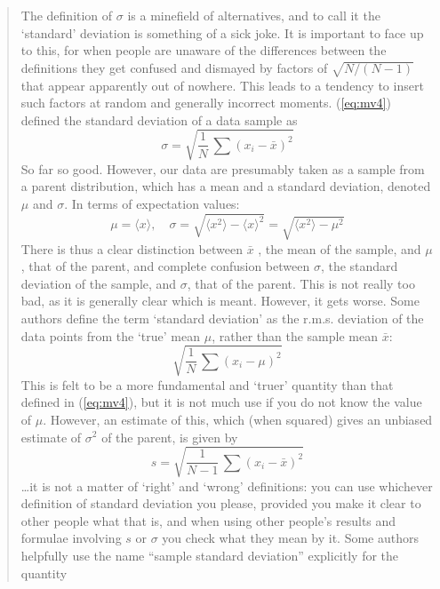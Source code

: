 \documentclass[12pt]{article}
\begin{document}
\begin{quote}
\noindent  The definition of $\sigma$ is a minefield of alternatives, and to call it the `standard'
   deviation is something of a sick joke.
It is important to face up to this, for when people are unaware of the differences between
    the definitions they get confused and dismayed by factors of $\sqrt{N/(N-1)}$ that appear apparently
	out of nowhere.
This leads to a tendency to insert such factors at random and generally incorrect moments.
(\ref{eq:mv4}) defined the standard deviation of a data sample as
\begin{equation}    \label{eq:mv5}
 \sigma =  \sqrt{\frac{1}{N}\,\sum (x_i - \bar{x})^2}
\end{equation}
So far so good.
However, our data are presumably taken as a sample from a parent distribution, which
     has a mean and a standard deviation, denoted $\mu$ and $\sigma$.
In terms of expectation values:
\begin{equation}   \label{eq:mv6}
  \mu = \langle x \rangle,  \quad  \sigma = \sqrt{ \langle x^2 \rangle - \langle x \rangle^2 } = \sqrt{ \langle x^2 \rangle - \mu^2 }
\end{equation}
There is thus a clear distinction between $\bar{x}$ , the mean of the sample, 
    and $\mu$, that of the parent, and complete confusion between $\sigma$, the
    standard deviation of the sample, and $\sigma$, that of the parent.
This is not really too bad, as it is generally clear which is meant.
However, it gets worse.
Some authors define the term `standard deviation' as the r.m.s. deviation of
   the data points from the `true' mean $\mu$, rather than the sample mean $\bar{x}$:
\begin{equation}    \label{eq:mv7}
    \sqrt{\frac{1}{N}\,\sum (x_i - \mu)^2}
\end{equation}   
This is felt to be a more fundamental and `truer' quantity than that defined in (\ref{eq:mv4}),
     but it is not much use if you do not know the value of $\mu$.
However, an estimate of this, which (when squared) gives an unbiased estimate of $\sigma^2$
   of the parent, is given by
\begin{equation}  \label{eq:mv8}
  s =  \sqrt{\frac{1}{N-1}\,\sum (x_i - \bar{x})^2}
\end{equation}
\ldots it is not a matter of `right' and `wrong' definitions: you can use whichever definition of
    standard deviation you please, provided you make it clear to other people what that is,
	and when using other people's results and formulae involving $s$ or $\sigma$ you
	check what they mean by it.
Some authors helpfully use the name ``sample standard deviation'' explicitly for the quantity

\end{quote}
\end{document}
